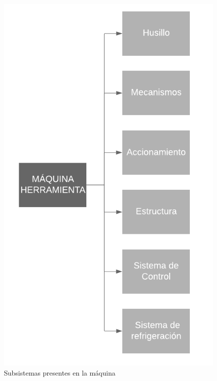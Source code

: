 \begin{figure}[ht!]
    \centering
    \includegraphics[height = 0.7\textheight]{Cap4_DisenoBasico/Figura/Subsistemas.pdf}
    \caption{Subsistemas presentes en la máquina}
    \label{fig:subsystems}
\end{figure}
\newpage


\newpage


\newpage
~
\newpage
%
